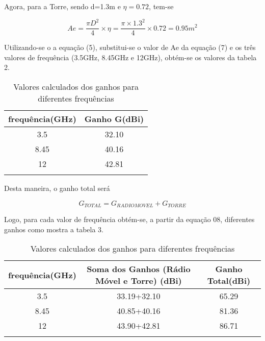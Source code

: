 \documentclass[a4paper,12pt]{article}
\begin{document}
Agora, para a Torre, sendo d=1.3m e $\eta = 0.72$, tem-se

\begin{equation}
 Ae = \dfrac{\pi D^2}{4} \times \eta = \dfrac{\pi \times 1.3^2}{4} \times 0.72 = 0.95 m^2
\end{equation}

Utilizando-se o a equação (5), substitui-se o valor de Ae da equação (7) e os três
valores de frequência (3.5GHz, 8.45GHz e 12GHz), obtém-se os valores da tabela
2.

\begin{table}[!h]
  \begin{center}
    \caption{Valores calculados dos ganhos para diferentes frequências} 
    \begin{tabular}{p{3in} p{3in}}\hline \hline
      \multicolumn{1}{c}{frequência(GHz)} & \multicolumn{1}{c}{Ganho G(dBi)}\\ \hline
      \multicolumn{1}{c}{3.5} & \multicolumn{1}{c}{32.10} \\ 
      \multicolumn{1}{c}{8.45} & \multicolumn{1}{c}{40.16} \\ 
      \multicolumn{1}{c}{12} & \multicolumn{1}{c}{42.81}\\ \hline
      &
    \end{tabular}
  \end{center}
\end{table}

Desta maneira, o ganho total será

\begin{equation}
 G_{TOTAL} = G_{RADIOMOVEL} + G_{TORRE}
\end{equation}

Logo, para cada valor de frequência obtém-se, a partir da equação 08, diferentes
ganhos como mostra a tabela 3.

\begin{table}[!h]
  \begin{center}
    \caption{Valores calculados dos ganhos para diferentes frequências} 
    \begin{tabular}{p{1in} p{3.5in} p{3in}}\hline \hline
      \multicolumn{1}{c}{frequência(GHz)} & \multicolumn{1}{c}{Soma dos Ganhos (Rádio Móvel e Torre) (dBi)} & \multicolumn{1}{c}{Ganho Total(dBi)}\\ \hline
      \multicolumn{1}{c}{3.5} & \multicolumn{1}{c}{33.19+32.10} & \multicolumn{1}{c}{65.29} \\ 
      \multicolumn{1}{c}{8.45} & \multicolumn{1}{c}{40.85+40.16} & \multicolumn{1}{c}{81.36} \\ 
      \multicolumn{1}{c}{12} & \multicolumn{1}{c}{43.90+42.81} & \multicolumn{1}{c}{86.71}\\ \hline
      &
    \end{tabular}
  \end{center}
\end{table}
\end{document}
